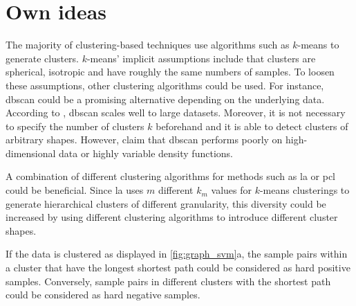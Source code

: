 \section{Own ideas}\label{sec:own_ideas}
\newcommand{\fisher}{Fisher's linear discriminant}

The majority of clustering-based techniques use algorithms such as $k$-means to generate clusters.
$k$-means' implicit assumptions include that clusters are spherical, isotropic and have roughly the same numbers of samples. %
To loosen these assumptions, other clustering algorithms could be used.
For instance, \ac{dbscan} could be a promising alternative depending on the underlying data.
According to \citet{local_aggr_2019}, \ac{dbscan} scales well to large datasets.
Moreover, it is not necessary to specify the number of clusters $k$ beforehand and 
it is able to detect clusters of arbitrary shapes.
However, \citeauthor{local_aggr_2019} claim that \ac{dbscan} performs poorly on 
high-dimensional data or highly variable density functions.

A combination of different clustering algorithms for methods such as 
\ac{la} \citet{local_aggr_2019} or \ac{pcl} \citet{PCL_2021} could be beneficial.
Since \ac{la} uses $m$ different $k_m$ values for $k$-means clusterings 
to generate hierarchical clusters of different granularity, 
this diversity could be increased by using different clustering algorithms to introduce different cluster shapes.


If the data is clustered as displayed in \autoref{fig:graph_svm}a,
the sample pairs within a cluster that have the longest shortest path could be considered as hard positive samples.
Conversely, sample pairs in different clusters with the shortest path could be considered as hard negative samples.

